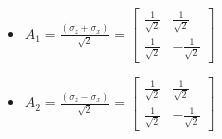 \documentclass{beamer}
\begin{document}
\begin{frame}
\begin{itemize}
\begin{itemize}
                    \hspace*{-2.5ex}
                    \begin{minipage}{0.5\textwidth}
                        \vspace{1.25ex}
                        \begin{itemize}
                            \item ${A}_{1} = \frac{({\sigma}_{z} + {\sigma}_{x})}{\sqrt{2}} = \begin{bmatrix}
                                 \frac{1}{\sqrt{2}} &  \frac{1}{\sqrt{2}} \\
                                 \frac{1}{\sqrt{2}} & -\frac{1}{\sqrt{2}}
                            \end{bmatrix}$
                            \vspace{2ex}
                            \item ${A}_{2} = \frac{({\sigma}_{z} - {\sigma}_{x})}{\sqrt{2}} = \begin{bmatrix}
                                 \frac{1}{\sqrt{2}} &  \frac{1}{\sqrt{2}} \\
                                 \frac{1}{\sqrt{2}} & -\frac{1}{\sqrt{2}}
                            \end{bmatrix}$
                        \end{itemize}
                    \end{minipage}

                    
                    
                \end{itemize}
            \end{itemize}
		\end{frame}
\end{document}
